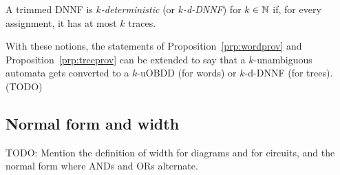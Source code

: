\begin{definition}
  A trimmed DNNF is \emph{$k$-deterministic} (or \emph{$k$-d-DNNF})
  for $k \in \mathbb{N}$ if, for every assignment, it has at most $k$ traces.
\end{definition}

With these notions, the statements of Proposition~\ref{prp:wordprov} and
Proposition~\ref{prp:treeprov} can be extended to say that a $k$-unambiguous
automata gets converted to a $k$-uOBDD (for words) or $k$-d-DNNF (for trees).
(TODO)

\subsection{Normal form and width}

TODO: Mention the definition of width for diagrams and for circuits, and the
normal form where ANDs and ORs alternate.

